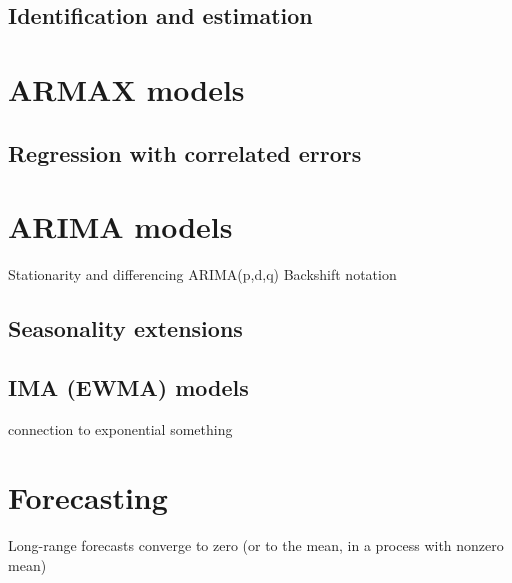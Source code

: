 \documentclass{article}
\begin{document}
\subsection{Identification and estimation}

\section{ARMAX models}

\subsection{Regression with correlated errors}

\section{ARIMA models}

Stationarity and differencing
ARIMA(p,d,q)
Backshift notation

\subsection{Seasonality extensions}

\subsection{IMA (EWMA) models}

connection to exponential something

\section{Forecasting}

Long-range forecasts converge to zero (or to the mean, in a process with 
nonzero mean)
\end{document}

